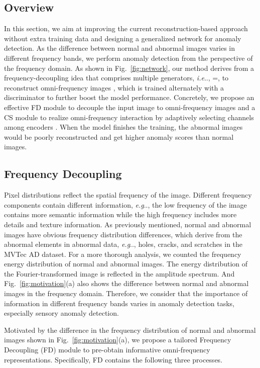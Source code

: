 \documentclass[lettersize,journal]{IEEEtran}
\makeatletter
\DeclareRobustCommand\onedot{\futurelet\@let@token\@onedot}
\def\@onedot{\ifx\@let@token.\else.\null\fi\xspace}
\def\eg{\emph{e.g}\onedot} \def\Eg{\emph{E.g}\onedot}
\def\ie{\emph{i.e}\onedot} \def\Ie{\emph{I.e}\onedot}
\makeatother
\begin{document}
\subsection{Overview}
In this section, we aim at improving the current reconstruction-based approach without extra training data and designing a generalized network for anomaly detection. As the difference between normal and abnormal images varies in different frequency bands, we perform anomaly detection from the perspective of the frequency domain. As shown in Fig.~\ref{fig:network}, our method derives from a frequency-decoupling idea that comprises multiple generators, \ie, =, to reconstruct omni-frequency images , which is trained alternately with a discriminator  to further boost the model performance. Concretely, we propose an effective FD module to decouple the input image  to omni-frequency images  and a CS module to realize omni-frequency interaction by adaptively selecting channels among encoders . When the model finishes the training, the abnormal images would be poorly reconstructed and get higher anomaly scores than normal images. 
\subsection{Frequency Decoupling}
Pixel distributions reflect the spatial frequency of the image. Different frequency components contain different information, \eg, the low frequency of the image contains more semantic information while the high frequency includes more details and texture information. As previously mentioned, normal and abnormal images have obvious frequency distribution differences, which derive from the abnormal elements in abnormal data, \eg, holes, cracks, and scratches in the MVTec AD dataset. For a more thorough analysis, we counted the frequency energy distribution of normal and abnormal images. The energy distribution of the Fourier-transformed image is reflected in the amplitude spectrum. And Fig.~\ref{fig:motivation}(a) also shows the difference between normal and abnormal images in the frequency domain. Therefore, we consider that the importance of information in different frequency bands varies in anomaly detection tasks, especially sensory anomaly detection.

Motivated by the difference in the frequency distribution of normal and abnormal images shown in Fig.~\ref{fig:motivation}(a), we propose a tailored Frequency Decoupling (FD) module to pre-obtain informative omni-frequency representations. Specifically, FD contains the following three processes. 
\end{document}
